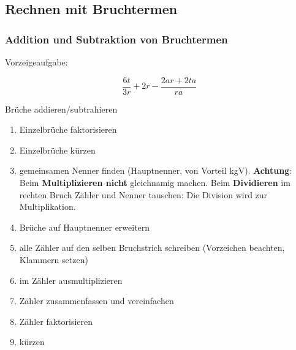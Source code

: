 \subsection{Rechnen mit Bruchtermen}

\subsubsection{Addition und Subtraktion von Bruchtermen}

Vorzeigeaufgabe:

$$\frac{6t}{3r} + 2r - \frac{2ar+2ta}{ra}$$



\begin{rezept}{Brüche addieren/subtrahieren}{}\label{bruchtermeRezept}
\begin{enumerate}
	\item Einzelbrüche faktorisieren
	\item Einzelbrüche kürzen
	\item gemeinsamen Nenner finden (Hauptnenner, von Vorteil
	kgV). \textbf{Achtung}: Beim \textbf{Multiplizieren nicht}
	gleichnamig machen. Beim \textbf{Dividieren} im rechten Bruch Zähler
	und Nenner tauschen: Die Division wird zur Multiplikation.
	\item Brüche auf Hauptnenner erweitern
	\item alle Zähler auf den selben Bruchstrich schreiben (Vorzeichen beachten, Klammern setzen)
	\item im Zähler ausmultiplizieren
	\item Zähler zusammenfassen und vereinfachen
	\item Zähler faktorisieren
	\item kürzen
\end{enumerate}
\end{rezept}


